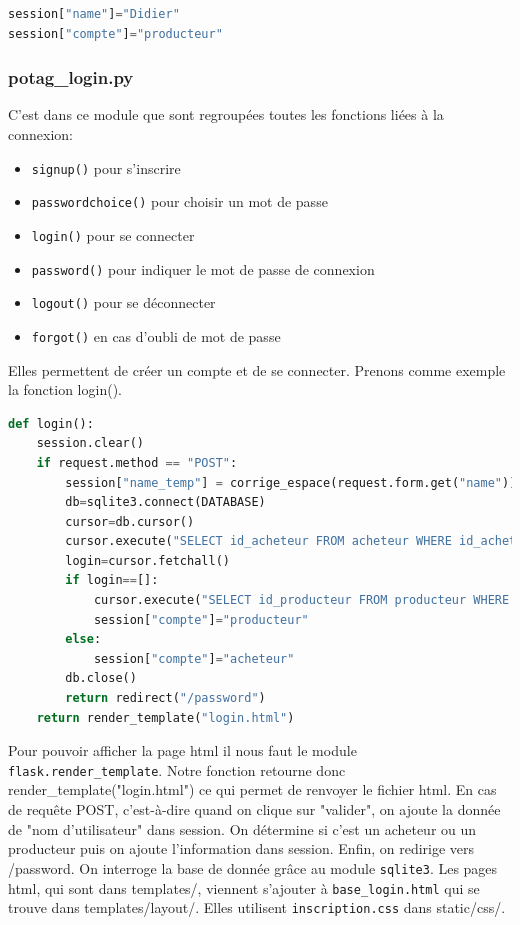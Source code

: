 \documentclass[11pt]{article}
\begin{document}
\begin{lstlisting}[language=Python, caption={Code Python permettant d'ajouter un élément dans session}]
session["name"]="Didier"
session["compte"]="producteur"
\end{lstlisting}

\subsubsection{potag\_login.py}

C'est dans ce module que sont regroupées toutes les fonctions liées à la connexion:
\begin{itemize} 
\item \texttt{signup()} pour s’inscrire 
\item \texttt{passwordchoice()} pour choisir un mot de passe
\item \texttt{login()} pour se connecter
\item \texttt{password()} pour indiquer le mot de passe de connexion
\item \texttt{logout()} pour se déconnecter
\item \texttt{forgot()} en cas d'oubli de mot de passe
\end{itemize} 
\vspace{0.4cm}

Elles permettent de créer un compte et de se connecter. Prenons comme exemple la fonction login().
\begin{lstlisting}[language=Python, caption={Fonction Python \texttt{login}}]
def login():
    session.clear()
    if request.method == "POST":
        session["name_temp"] = corrige_espace(request.form.get("name"))
        db=sqlite3.connect(DATABASE)
        cursor=db.cursor()
        cursor.execute("SELECT id_acheteur FROM acheteur WHERE id_acheteur= ?", (session["name_temp"], ))
        login=cursor.fetchall()
        if login==[]:
            cursor.execute("SELECT id_producteur FROM producteur WHERE id_producteur= ?", (session["name_temp"], ))
            session["compte"]="producteur"
        else:
            session["compte"]="acheteur"
        db.close()
        return redirect("/password")
    return render_template("login.html")
\end{lstlisting}

Pour pouvoir afficher la page html il nous faut le module \texttt{flask.render\_template}. Notre fonction retourne donc render\_template("login.html") ce qui permet de renvoyer le fichier html. En cas de requête POST, c'est-à-dire quand on clique sur "valider", on ajoute la donnée de "nom d'utilisateur" dans session. On détermine si c'est un acheteur ou un producteur puis on ajoute l’information dans session. Enfin, on redirige vers /password. On interroge la base de donnée grâce au module \texttt{sqlite3}. Les pages html, qui sont dans templates/, viennent s'ajouter à \texttt{base\_login.html} qui se trouve dans templates/layout/. Elles utilisent \texttt{inscription.css} dans static/css/.
\end{document}
